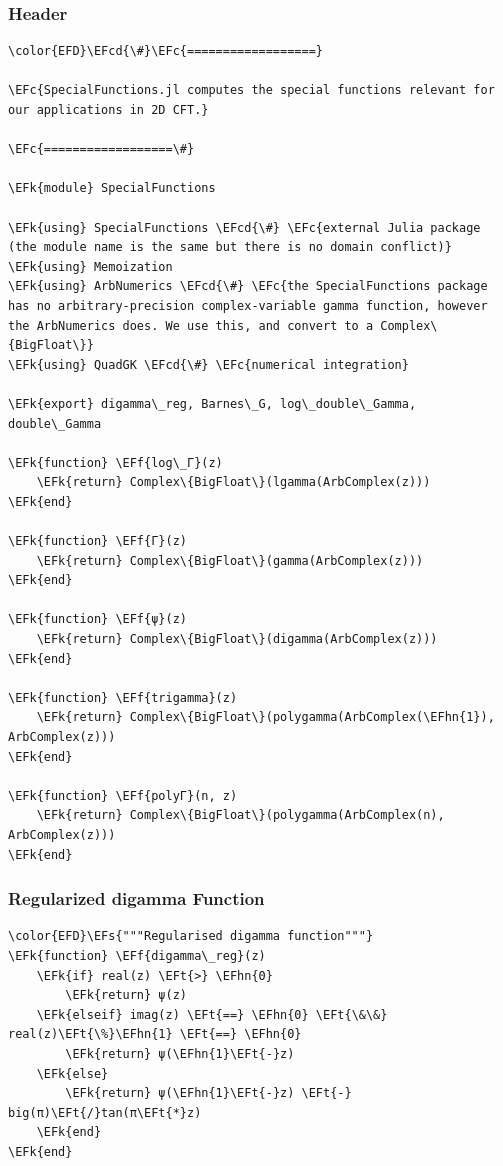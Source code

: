 \documentclass[a4paper]{article}
\numberwithin{equation}{section}
\newcommand{\EFc}[1]{\textcolor{EFc}{#1}} %
\newcommand{\EFcd}[1]{\textcolor{EFcd}{#1}} %
\newcommand{\EFs}[1]{\textcolor{EFs}{#1}} %
\newcommand{\EFk}[1]{\textcolor{EFk}{#1}} %
\newcommand{\EFf}[1]{\textcolor{EFf}{#1}} %
\newcommand{\EFt}[1]{\textcolor{EFt}{#1}} %
\newcommand{\EFhn}[1]{\textcolor{EFhn}{#1}} %
\begin{document}
\subsubsection*{Header}
\label{sec:orgf51f058}

\begin{Code}
\begin{Verbatim}
\color{EFD}\EFcd{\#}\EFc{==================}

\EFc{SpecialFunctions.jl computes the special functions relevant for our applications in 2D CFT.}

\EFc{==================\#}

\EFk{module} SpecialFunctions

\EFk{using} SpecialFunctions \EFcd{\#} \EFc{external Julia package (the module name is the same but there is no domain conflict)}
\EFk{using} Memoization
\EFk{using} ArbNumerics \EFcd{\#} \EFc{the SpecialFunctions package has no arbitrary-precision complex-variable gamma function, however the ArbNumerics does. We use this, and convert to a Complex\{BigFloat\}}
\EFk{using} QuadGK \EFcd{\#} \EFc{numerical integration}

\EFk{export} digamma\_reg, Barnes\_G, log\_double\_Gamma, double\_Gamma

\EFk{function} \EFf{log\_Γ}(z)
    \EFk{return} Complex\{BigFloat\}(lgamma(ArbComplex(z)))
\EFk{end}

\EFk{function} \EFf{Γ}(z)
    \EFk{return} Complex\{BigFloat\}(gamma(ArbComplex(z)))
\EFk{end}

\EFk{function} \EFf{ψ}(z)
    \EFk{return} Complex\{BigFloat\}(digamma(ArbComplex(z)))
\EFk{end}

\EFk{function} \EFf{trigamma}(z)
    \EFk{return} Complex\{BigFloat\}(polygamma(ArbComplex(\EFhn{1}), ArbComplex(z)))
\EFk{end}

\EFk{function} \EFf{polyΓ}(n, z)
    \EFk{return} Complex\{BigFloat\}(polygamma(ArbComplex(n), ArbComplex(z)))
\EFk{end}
\end{Verbatim}
\end{Code}
\subsubsection*{Regularized digamma Function}
\label{sec:org902abd8}

\begin{Code}
\begin{Verbatim}
\color{EFD}\EFs{"""Regularised digamma function"""}
\EFk{function} \EFf{digamma\_reg}(z)
    \EFk{if} real(z) \EFt{>} \EFhn{0}
        \EFk{return} ψ(z)
    \EFk{elseif} imag(z) \EFt{==} \EFhn{0} \EFt{\&\&} real(z)\EFt{\%}\EFhn{1} \EFt{==} \EFhn{0}
        \EFk{return} ψ(\EFhn{1}\EFt{-}z)
    \EFk{else}
        \EFk{return} ψ(\EFhn{1}\EFt{-}z) \EFt{-} big(π)\EFt{/}tan(π\EFt{*}z)
    \EFk{end}
\EFk{end}
\end{Verbatim}
\end{Code}
\end{document}
